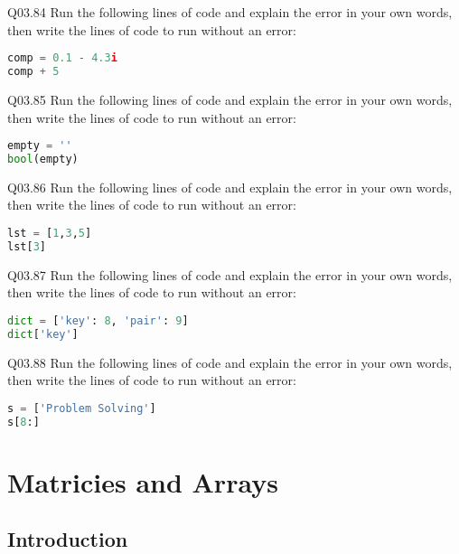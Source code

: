 \documentclass{book}
\newenvironment{problems}{}{}  %
\begin{document}
\begin{problems}
Q03.84 Run the following lines of code and explain the error in your own
words, then write the lines of code to run without an error:

\begin{lstlisting}[language=Python]
comp = 0.1 - 4.3i
comp + 5
\end{lstlisting}

Q03.85 Run the following lines of code and explain the error in your own
words, then write the lines of code to run without an error:

\begin{lstlisting}[language=Python]
empty = ''
bool(empty)
\end{lstlisting}

Q03.86 Run the following lines of code and explain the error in your own
words, then write the lines of code to run without an error:

\begin{lstlisting}[language=Python]
lst = [1,3,5]
lst[3]
\end{lstlisting}

Q03.87 Run the following lines of code and explain the error in your own
words, then write the lines of code to run without an error:

\begin{lstlisting}[language=Python]
dict = ['key': 8, 'pair': 9]
dict['key']
\end{lstlisting}

Q03.88 Run the following lines of code and explain the error in your own
words, then write the lines of code to run without an error:

\begin{lstlisting}[language=Python]
s = ['Problem Solving']
s[8:]
\end{lstlisting}
        \end{problems}

    




    
        \hypertarget{matricies-and-arrays}{%
\chapter{Matricies and Arrays}\label{matricies-and-arrays}}
    




    
        \hypertarget{introduction}{%
\section{Introduction}\label{introduction}}
    
\end{document}
